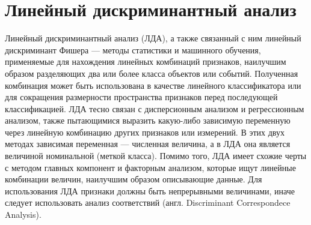 ﻿\documentclass[a4paper,12pt]{article}
\theoremstyle{plain}
\begin{document}
\clearpage
	
\newpage



\section{Линейный дискриминантный анализ}
Линейный дискриминантный анализ (ЛДА), а также связанный с ним линейный дискриминант Фишера — методы статистики и машинного обучения, применяемые для нахождения линейных комбинаций признаков, наилучшим образом разделяющих два или более класса объектов или событий. Полученная комбинация может быть использована в качестве линейного классификатора или для сокращения размерности пространства признаков перед последующей классификацией.
ЛДА тесно связан с дисперсионным анализом и регрессионным анализом, также пытающимися выразить какую-либо зависимую переменную через линейную комбинацию других признаков или измерений. В этих двух методах зависимая переменная — численная величина, а в ЛДА она является величиной номинальной (меткой класса). Помимо того, ЛДА имеет схожие черты с методом главных компонент и факторным анализом, которые ищут линейные комбинации величин, наилучшим образом описывающие данные.
Для использования ЛДА признаки должны быть непрерывными величинами, иначе следует использовать анализ соответствий (англ. Discriminant Correspondece Analysis).
\end{document}
